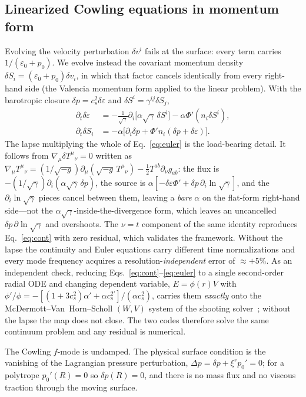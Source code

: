 \documentclass[aps,prd,reprint,amsmath,amssymb,nofootinbib,longbibliography,superscriptaddress]{revtex4-2}
\newcommand{\cs}{c_s}
\newcommand{\de}{\delta\varepsilon}
\newcommand{\dS}{\delta S}
\newcommand{\dv}{\delta v}
\newcommand{\dpp}{\delta p}
\newcommand{\sg}{\sqrt{\gamma}}
\begin{document}
\subsection{Linearized Cowling equations in momentum form}
\label{sec:cowling}
Evolving the velocity perturbation $\dv^i$ fails at the surface: every term carries
$1/(\varepsilon_0+p_0)$. We evolve instead the covariant momentum density
$\dS_i = (\varepsilon_0+p_0)\dv_i$, in which that factor cancels identically from every
right-hand side (the Valencia momentum form applied to the linear problem). With the barotropic
closure $\dpp = \cs^2\de$ and $\dS^i = \gamma^{ij}\dS_j$,
\begin{align}
\partial_t\de &= -\frac{1}{\sg}\partial_i\big[\alpha\sg\,\dS^i\big] - \alpha\Phi'(n_i\dS^i),
\label{eq:cont}\\
\partial_t\dS_i &= -\alpha\big[\partial_i\dpp + \Phi'n_i(\dpp+\de)\big].
\label{eq:euler}
\end{align}
The lapse multiplying the whole of Eq.~\eqref{eq:euler} is the load-bearing detail. It follows
from $\nabla_\mu\delta T^{\mu}{}_\nu = 0$ written as
$\nabla_\mu T^{\mu}{}_\nu = (1/\sqrt{-g})\partial_\mu(\sqrt{-g}\,T^{\mu}{}_\nu) - \tfrac12T^{ab}\partial_\nu g_{ab}$:
the flux is $-(1/\sg)\partial_i(\alpha\sg\,\dpp)$, the source is
$\alpha[-\de\Phi' + \dpp\,\partial_i\ln\sg]$, and the $\partial_i\ln\sg$ pieces cancel between
them, leaving a \emph{bare} $\alpha$ on the flat-form right-hand side---not the
$\alpha\sg$-inside-the-divergence form, which leaves an uncancelled $\dpp\,\partial\ln\sg$ and
overshoots. The $\nu=t$ component of the same identity reproduces Eq.~\eqref{eq:cont} with zero
residual, which validates the framework. Without the lapse the continuity and Euler equations
carry different time normalizations and every mode frequency acquires a
resolution-\emph{independent} error of $\approx+5\%$. As an independent check, reducing
Eqs.~\eqref{eq:cont}--\eqref{eq:euler} to a single second-order radial ODE and changing dependent
variable, $E = \phi(r)V$ with $\phi'/\phi = -[(1+3\cs^2)\alpha' + \alpha\cs^{2\prime}]/(\alpha\cs^2)$,
carries them \emph{exactly} onto the McDermott--Van~Horn--Scholl $(W,V)$ system of the shooting
solver~\cite{Sotani2024}; without the lapse the map does not close. The two codes therefore
solve the same continuum problem and any residual is numerical.

The Cowling $f$-mode is undamped. The physical surface condition is the vanishing of the
Lagrangian pressure perturbation, $\Delta p = \dpp + \xi^rp_0' = 0$; for a polytrope
$p_0'(R) = 0$ so $\dpp(R) = 0$, and there is no mass flux and no viscous traction through the
moving surface.
\end{document}
